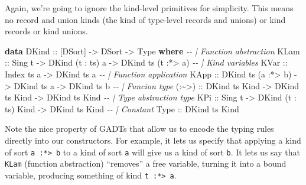 \documentclass[]{article}
\newenvironment{Shaded}{}{}
\newcommand{\CommentTok}[1]{\textcolor[rgb]{0.38,0.63,0.69}{\textit{#1}}}
\newcommand{\DataTypeTok}[1]{\textcolor[rgb]{0.56,0.13,0.00}{#1}}
\newcommand{\KeywordTok}[1]{\textcolor[rgb]{0.00,0.44,0.13}{\textbf{#1}}}
\newcommand{\NormalTok}[1]{#1}
\newcommand{\OperatorTok}[1]{\textcolor[rgb]{0.40,0.40,0.40}{#1}}
\newcommand{\OtherTok}[1]{\textcolor[rgb]{0.00,0.44,0.13}{#1}}
\begin{document}
Again, we're going to ignore the kind-level primitives for simplicity. This
means no record and union kinds (the kind of type-level records and unions) or
kind records or kind unions.

\begin{Shaded}
\begin{Highlighting}[]
\KeywordTok{data} \DataTypeTok{DKind}\OtherTok{ ::}\NormalTok{ [}\DataTypeTok{DSort}\NormalTok{] }\OtherTok{{-}\textgreater{}} \DataTypeTok{DSort} \OtherTok{{-}\textgreater{}} \DataTypeTok{Type} \KeywordTok{where}
    \CommentTok{{-}{-} | Function abstraction}
    \DataTypeTok{KLam}\OtherTok{  ::} \DataTypeTok{Sing}\NormalTok{ t }\OtherTok{{-}\textgreater{}} \DataTypeTok{DKind}\NormalTok{ (t \textquotesingle{}}\OperatorTok{:}\NormalTok{ ts) a }\OtherTok{{-}\textgreater{}} \DataTypeTok{DKind}\NormalTok{ ts (t \textquotesingle{}}\OperatorTok{:*\textgreater{}}\NormalTok{ a)}
    \CommentTok{{-}{-} | Kind variables}
    \DataTypeTok{KVar}\OtherTok{  ::} \DataTypeTok{Index}\NormalTok{ ts a }\OtherTok{{-}\textgreater{}} \DataTypeTok{DKind}\NormalTok{ ts a}
    \CommentTok{{-}{-} | Function application}
    \DataTypeTok{KApp}\OtherTok{  ::} \DataTypeTok{DKind}\NormalTok{ ts (a \textquotesingle{}}\OperatorTok{:*\textgreater{}}\NormalTok{ b) }\OtherTok{{-}\textgreater{}} \DataTypeTok{DKind}\NormalTok{ ts a }\OtherTok{{-}\textgreater{}} \DataTypeTok{DKind}\NormalTok{ ts b}
    \CommentTok{{-}{-} | Funcion type}
\OtherTok{    (:\textasciitilde{}\textgreater{}) ::} \DataTypeTok{DKind}\NormalTok{ ts }\DataTypeTok{\textquotesingle{}Kind} \OtherTok{{-}\textgreater{}} \DataTypeTok{DKind}\NormalTok{ ts }\DataTypeTok{\textquotesingle{}Kind} \OtherTok{{-}\textgreater{}} \DataTypeTok{DKind}\NormalTok{ ts }\DataTypeTok{\textquotesingle{}Kind}
    \CommentTok{{-}{-} | Type abstraction type}
    \DataTypeTok{KPi}\OtherTok{   ::} \DataTypeTok{Sing}\NormalTok{ t }\OtherTok{{-}\textgreater{}} \DataTypeTok{DKind}\NormalTok{ (t \textquotesingle{}}\OperatorTok{:}\NormalTok{ ts) }\DataTypeTok{\textquotesingle{}Kind} \OtherTok{{-}\textgreater{}} \DataTypeTok{DKind}\NormalTok{ ts }\DataTypeTok{\textquotesingle{}Kind}
    \CommentTok{{-}{-} | Constant}
    \DataTypeTok{Type}\OtherTok{  ::} \DataTypeTok{DKind}\NormalTok{ ts }\DataTypeTok{\textquotesingle{}Kind}
\end{Highlighting}
\end{Shaded}

Note the nice property of GADTs that allow us to encode the typing rules
directly into our constructors. For example, it lets us specify that applying a
kind of sort \texttt{a\ :*\textgreater{}\ b} to a kind of sort \texttt{a} will
give us a kind of sort \texttt{b}. It lets us say that \texttt{KLam} (function
abstraction) ``removes'' a free variable, turning it into a bound variable,
producing something of kind \texttt{t\ :*\textgreater{}\ a}.
\end{document}

